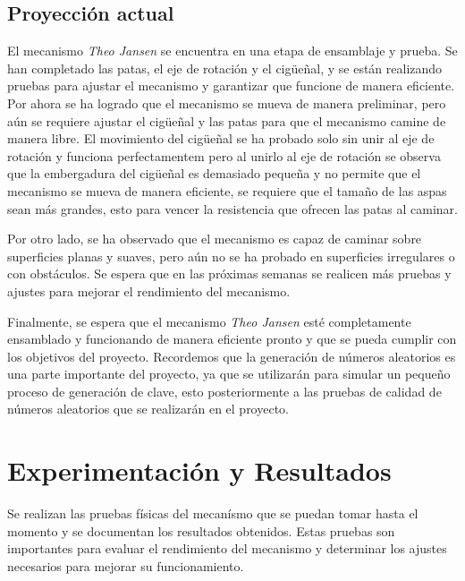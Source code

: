 \subsection{Proyección actual}
El mecanismo \textit{Theo Jansen} se encuentra en una etapa de ensamblaje y prueba. Se han completado las patas, el eje de rotación y el cigüeñal, y se están realizando pruebas para ajustar el mecanismo y garantizar que funcione de manera eficiente. Por ahora se ha logrado que el mecanismo se mueva de manera preliminar, pero aún se requiere ajustar el cigüeñal y las patas para que el mecanismo camine de manera libre. El movimiento del cigüeñal se ha probado solo sin unir al eje de rotación y funciona perfectamentem pero al unirlo al eje de rotación se observa que la embergadura del cigüeñal es demasiado pequeña y no permite que el mecanismo se mueva de manera eficiente, se requiere que el tamaño de las aspas sean más grandes, esto para vencer la resistencia que ofrecen las patas al caminar.

Por otro lado, se ha observado que el mecanismo es capaz de caminar sobre superficies planas y suaves, pero aún no se ha probado en superficies irregulares o con obstáculos. Se espera que en las próximas semanas se realicen más pruebas y ajustes para mejorar el rendimiento del mecanismo.

Finalmente, se espera que el mecanismo \textit{Theo Jansen} esté completamente ensamblado y funcionando de manera eficiente pronto y que se pueda cumplir con los objetivos del proyecto. Recordemos que la generación de números aleatorios es una parte importante del proyecto, ya que se utilizarán para simular un pequeño proceso de generación de clave, esto posteriormente a las pruebas de calidad de números aleatorios que se realizarán en el proyecto.

\section{Experimentación y Resultados}

Se realizan las pruebas físicas del mecanísmo que se puedan tomar hasta el momento y se documentan los resultados obtenidos. Estas pruebas son importantes para evaluar el rendimiento del mecanismo y determinar los ajustes necesarios para mejorar su funcionamiento.


